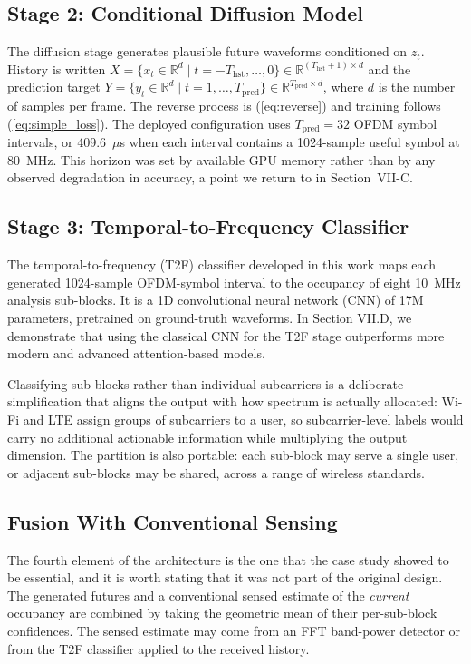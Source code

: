 \documentclass[lettersize,journal]{IEEEtran}
\newcommand{\us}{\ensuremath{\mu}s}
\begin{document}
\subsection{\textbf{Stage 2: Conditional Diffusion Model}}
The diffusion stage generates plausible future waveforms conditioned on
$z_t$. History is written
$X = \{x_t \in \mathbb{R}^d \mid t = -T_{\mathrm{hst}}, \ldots, 0\}
\in \mathbb{R}^{(T_{\mathrm{hst}}+1)\times d}$
and the prediction target
$Y = \{y_t \in \mathbb{R}^d \mid t = 1, \ldots, T_{\mathrm{pred}}\}
\in \mathbb{R}^{T_{\mathrm{pred}}\times d}$,
where $d$ is the number of samples per frame. The reverse process is
(\ref{eq:reverse}) and training follows (\ref{eq:simple_loss}). The
deployed configuration uses $T_{\mathrm{pred}} = 32$ OFDM symbol intervals, or
 409.6~\us{} when each interval contains a 1024-sample useful symbol at 80~MHz.
This horizon was set by available GPU memory
rather than by any observed degradation in accuracy, a point we return
to in Section~VII-C.

\subsection{\textbf{Stage 3: Temporal-to-Frequency Classifier}}
The temporal-to-frequency (T2F) classifier 
developed in this work maps each generated 1024-sample
OFDM-symbol interval
to the occupancy of eight 10~MHz analysis sub-blocks. It is a 1D
convolutional neural network (CNN) of 17M parameters, 
pretrained on ground-truth
waveforms. In Section VII.D, we demonstrate that using the 
classical CNN for the T2F stage outperforms more modern and advanced 
attention-based models.

Classifying sub-blocks rather than individual subcarriers is a
deliberate simplification that aligns the output with how spectrum is
actually allocated: Wi-Fi and LTE assign groups of subcarriers to a
user, so subcarrier-level labels would carry no additional actionable
information while multiplying the output dimension. The partition is also
portable: each sub-block may serve a single user, or adjacent sub-blocks may be
shared, across a range of wireless standards.

\subsection{\textbf{Fusion With Conventional Sensing}}
The fourth element of the architecture is the one that the case study
showed to be essential, and it is worth stating that it was not part of
the original design. The generated futures and a conventional sensed
estimate of the \emph{current} occupancy are combined by taking the
geometric mean of their per-sub-block confidences. The sensed estimate
may come from an FFT band-power detector or from the T2F classifier
applied to the received history.
\end{document}
